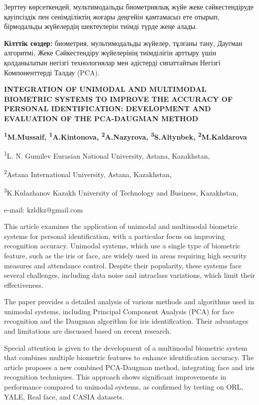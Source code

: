 Зерттеу көрсеткендей, мультимодальды биометриялық жүйе жеке
сәйкестендіруде қауіпсіздік пен сенімділіктің жоғары деңгейін қамтамасыз
ете отырып, бірмодальды жүйелердің шектеулерін тиімді түрде жеңе алады.

{\bfseries Кілттік сөздер:} биометрия, мультимодальды жүйелер, тұлғаны
тану, Даугман алгоритмі, Жеке Сәйкестендіру жүйелерінің тиімділігін
арттыру үшін қолданылатын негізгі технологиялар мен әдістерді
сипаттайтын Негізгі Компоненттерді Талдау (PCA).

\begin{center}
{\large\bfseries INTEGRATION OF UNIMODAL AND MULTIMODAL BIOMETRIC SYSTEMS TO
IMPROVE THE ACCURACY OF PERSONAL IDENTIFICATION: DEVELOPMENT AND
EVALUATION OF THE PCA-DAUGMAN METHOD}

{\bfseries \textsuperscript{1}M.Mussaif, \textsuperscript{1}A.Kintonova,
\textsuperscript{2}A.Nazyrova, \textsuperscript{3}S.Altynbek,
\textsuperscript{2}M.Kaldarova}

\textsuperscript{1}L. N. Gumilev Eurasian National University, Astana,
Kazakhstan,

\textsuperscript{2}Astana International University, Astana, Kazakhstan,

\textsuperscript{3}K.Kulazhanov Kazakh University of Technology and
Business, Kazakhstan,

e-mail: kzldkz@gmail.com
\end{center}

This article examines the application of unimodal and multimodal
biometric systems for personal identification, with a particular focus
on improving recognition accuracy. Unimodal systems, which use a single
type of biometric feature, such as the iris or face, are widely used in
areas requiring high security measures and attendance control. Despite
their popularity, these systems face several challenges, including data
noise and intraclass variations, which limit their effectiveness.

The paper provides a detailed analysis of various methods and algorithms
used in unimodal systems, including Principal Component Analysis (PCA)
for face recognition and the Daugman algorithm for iris identification.
Their advantages and limitations are discussed based on recent research.

Special attention is given to the development of a multimodal biometric
system that combines multiple biometric features to enhance
identification accuracy. The article proposes a new combined PCA-Daugman
method, integrating face and iris recognition techniques. This approach
shows significant improvements in performance compared to unimodal
systems, as confirmed by testing on ORL, YALE, Real face, and CASIA
datasets.

